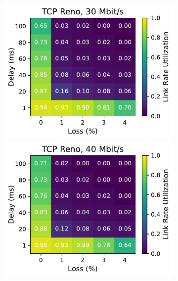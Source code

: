 \begin{figure}[ht]
\begin{subfigure}[b]{0.22\linewidth}
        \includegraphics[width=\linewidth,trim={0 0 2cm 0},clip]{splitting-paper/figures/heatmaps/heatmap_tcp_reno_30mbps.pdf}
        \includegraphics[width=\linewidth,trim={0 0 2cm 0},clip]{splitting-paper/figures/heatmaps/heatmap_tcp_reno_40mbps.pdf}

\end{subfigure}
\end{figure}

